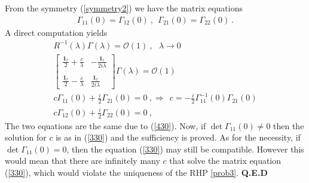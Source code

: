 \documentclass{article}
\def\1{\mathbf 1}
\def\bea{\begin{eqnarray}}
\def\eea{\end{eqnarray}}
\def\QED{ {\bf Q.E.D}\par \vskip 4pt}
\newcommand{\be}{\begin{eqnarray}}
\newcommand{\ee}{\end{eqnarray}}
\def\le{\left}
\def\ri{\right}
\begin{document}
From the symmetry (\ref{symmetry2}) we have the matrix equations
\be
\Gamma_{11}(0) = \Gamma_{12}(0)\ ,\ \ \Gamma_{21}(0) = \Gamma_{22}(0)\ .
\label{430}
\ee
A direct computation yields
\bea
R^{-1}(\lambda) \Gamma(\lambda) = \mathcal O(1) \ ,\ \ \ \lambda\to 0\\
\le[
\begin{array}{cc}
\frac {\1_r} 2  + \frac {c}\lambda  &  -\frac {\1_r}{2i\lambda}\\
\\
\frac {\1_r} 2 - \frac {c}\lambda  & \frac {\1_r}{2i\lambda}
\end{array}
\ri] \Gamma(\lambda) =\mathcal O(1)\\
c \Gamma_{11}(0) +\frac i 2 \Gamma_{21}(0) =0\ ,\Rightarrow \ \ 
c = -\frac i 2 \Gamma_{11}^{-1}(0)  \Gamma_{21}(0)\label{330}\\
c \Gamma_{12}(0) +\frac i 2 \Gamma_{22}(0) =0\ ,
\eea
%
The two equations are the same due to (\ref{430}).
Now, if $\det \Gamma_{11}(0)\neq 0$ then the solution for $c$ is as in (\ref{330}) and the sufficiency is proved.
As for the necessity, if $\det \Gamma_{11}(0)=0$, then the equation (\ref{330}) may still be compatible. However this would mean that there are infinitely many $c$ that solve the matrix equation (\ref{330}), which would violate the uniqueness of  the RHP \ref{prob3}. \QED
%
\end{document}
